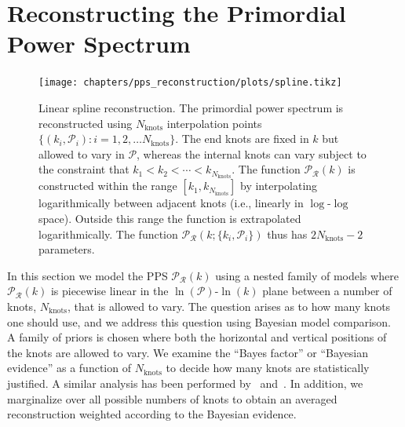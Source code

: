 \newcommand{\PR}{\mathcal{P}_\mathcal{R}}
\newcommand{\alphamink}{\alpha_\mathrm{min}^{(k)}}
\newcommand{\alphamaxk}{\alpha_\mathrm{max}^{(k)}}
\newcommand{\Pknotj}[1]{\mathcal{P}_{#1}}
\newcommand{\Pknot}{\mathcal{P}}
\newcommand{\As}{A_\mathrm{s}}
\newcommand{\Asj}[1]{A_\mathrm{s}^{(#1)}}
\newcommand{\Nint}{N_\mathrm{int}}
\newcommand{\Nknots}{N_\mathrm{knots}}
\newcommand{\Planck}{\textit{Planck}}


\chapter[PPS reconstruction]{Reconstructing the Primordial Power Spectrum}
\label{chap:rec}

\begin{figure}[tp]
    \texttt{[image: chapters/pps\_reconstruction/plots/spline.tikz]}
  \caption{%
    Linear spline reconstruction. The primordial power spectrum is reconstructed using \(\Nknots\) interpolation points
    \({\{(k_i,\Pknotj{i}):i=1,2,\ldots {\Nknots}\}}\). The end knots are fixed in \(k\) but allowed to
    vary in \({\Pknot}\), whereas the internal knots can vary subject to the constraint that \({k_1<k_2<\cdots<k_{\Nknots}}\).
    The function \(\mathcal{P}_\mathcal{R}(k)\) is constructed within the range \([k_1,k_{\Nknots}]\)
    by interpolating logarithmically between adjacent knots (i.e., linearly in \(\log\)-\(\log\) space). Outside this range the function is extrapolated logarithmically.
    The function \(\mathcal{P}_\mathcal{R}(k;\{k_i,\Pknotj{i}\})\) thus has \(2\Nknots-2\) parameters.\label{fig:linear_spline_reconstruction}
  }
\end{figure}



In this section we model the PPS \(\PR(k)\) using a nested
family of models where \(\PR(k)\) is piecewise linear
in the \(\ln (\mathcal{P})\)-\(\ln (k)\) plane
between a number of knots, \(\Nknots\),
that is allowed to vary. The question arises as to how many knots one should use,
and we address this question using Bayesian model comparison.
A family of priors
is chosen where both the horizontal and vertical positions of the knots are allowed
to vary. We examine the ``Bayes factor'' or ``Bayesian evidence'' as a function of
\(\Nknots\) to decide how many knots are statistically justified. 
A similar analysis has been performed by~\cite{vazquez_knots} and~\cite{knottedsky1}.
In addition, we marginalize over all possible numbers of knots to obtain 
an averaged reconstruction weighted according to the Bayesian evidence.

